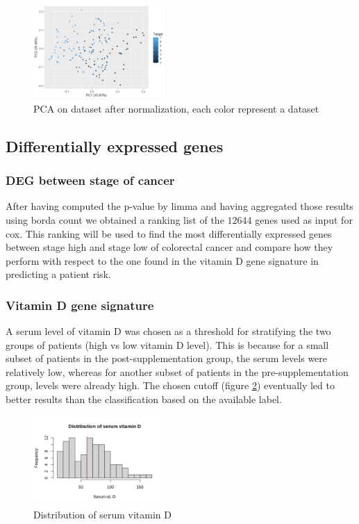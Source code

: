 \documentclass[fleqn,10pt]{SelfArx} %
\begin{document}
		\begin{figure}[ht]
			\includegraphics[width=0.45\textwidth]{figures/post_norm.png}
			\caption{PCA on dataset after normalization, each color represent a dataset}
			\label{fig:post_norm}
		\end{figure}

	\subsection{Differentially expressed genes}

		\subsubsection{DEG between stage of cancer}
		After having computed the p-value by limma and having aggregated those results using borda count we obtained a ranking list of the $12644$ genes used as input for cox.
		This ranking will be used to find the most differentially expressed genes between stage high and stage low of colorectal cancer and compare how they perform with respect to the one found in the vitamin D gene signature in predicting a patient risk.

		\subsubsection{Vitamin D gene signature}
		A serum level of vitamin D was chosen as a threshold for stratifying the two groups of patients (high vs low vitamin D level). This is because for a small subset of patients in the post-supplementation group, the serum levels were relatively low, whereas for another subset of patients in the pre-supplementation group, levels were already high. The chosen cutoff (figure \ref{fig:serum_level}) eventually led to better results than the classification based on the available label.

		\begin{figure}[ht]
			\includegraphics[width=0.45\textwidth]{figures/serum_level.png}
			\caption{Distribution of serum vitamin D}
			\label{fig:serum_level}
		\end{figure}
\end{document}
